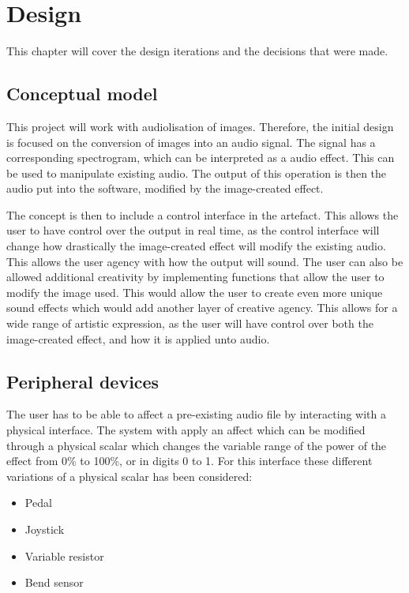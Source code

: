 \chapter{Design}\label{ch:design}
This chapter will cover the design iterations and the decisions that were made. 

\section{Conceptual model}
This project will work with audiolisation of images. Therefore, the initial design is focused on the conversion of images into an audio signal. The signal has a corresponding spectrogram, which can be interpreted as a audio effect. This can be used to manipulate existing audio. The output of this operation is then the audio put into the software, modified by the image-created effect.

The concept is then to include a control interface in the artefact. This allows the user to have control over the output in real time, as the control interface will change how drastically the image-created effect will modify the existing audio. This allows the user agency with how the output will sound. The user can also be allowed additional creativity by implementing functions that allow the user to modify the image used. This would allow the user to create even more unique sound effects which would add another layer of creative agency. This allows for a wide range of artistic expression, as the user will have control over both the image-created effect, and how it is applied unto audio.

\section{Peripheral devices}
The user has to be able to affect a pre-existing audio file by interacting with a physical interface. The system with apply an affect which can be modified through a physical scalar which changes the variable range of the power of the effect from 0\% to 100\%, or in digits 0 to 1. For this interface these different variations of a physical scalar has been considered: 

\begin{itemize}
\item Pedal
\item Joystick
\item Variable resistor
\item Bend sensor
\end{itemize}

